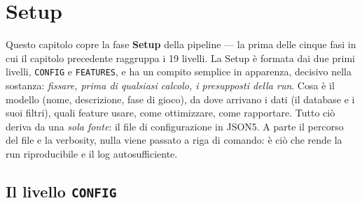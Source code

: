%
%
%
%
%
%
%
%

%

\chapter{Setup}

Questo capitolo copre la fase \textbf{Setup} della pipeline — la prima delle
cinque fasi in cui il capitolo precedente raggruppa i 19 livelli. La Setup è
formata dai due primi livelli, \texttt{CONFIG} e \texttt{FEATURES}, e ha un
compito semplice in apparenza, decisivo nella sostanza: \emph{fissare, prima
di qualsiasi calcolo, i presupposti della run}. Cosa è il modello (nome,
descrizione, fase di gioco), da dove arrivano i dati (il database e i suoi
filtri), quali feature usare, come ottimizzare, come rapportare. Tutto ciò
deriva da una \emph{sola fonte}: il file di configurazione in JSON5. A parte
il percorso del file e la verbosity, nulla viene passato a riga di comando:
è ciò che rende la run riproducibile e il log autosufficiente.

\section{Il livello \texttt{CONFIG}}

